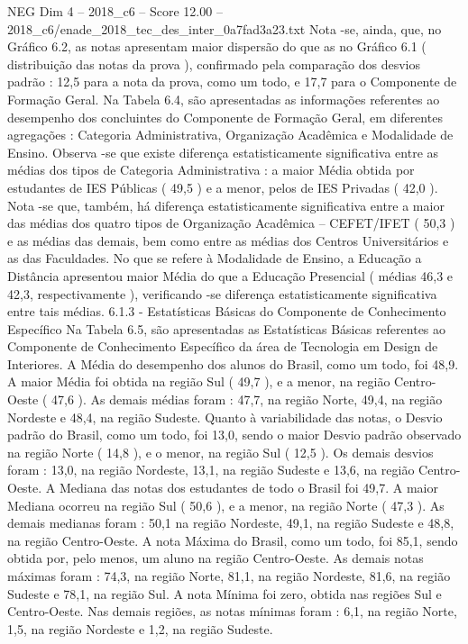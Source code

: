 \begin{textsample}{NEG Dim 4 – 2018\_c6 – Score 12.00 – 2018\_c6/enade\_2018\_tec\_des\_inter\_0a7fad3a23.txt}
Nota -se, ainda, que, no Gráfico 6.2, as notas apresentam maior dispersão do que as no Gráfico 6.1 ( distribuição das notas da prova ), confirmado pela comparação dos desvios padrão : 12,5 para a nota da prova, como um todo, e 17,7 para o Componente de Formação Geral.
Na Tabela 6.4, são apresentadas as informações referentes ao desempenho dos concluintes do Componente de Formação Geral, em diferentes agregações : Categoria Administrativa, Organização Acadêmica e Modalidade de Ensino.
Observa -se que existe diferença estatisticamente significativa entre as médias dos tipos de Categoria Administrativa : a maior Média obtida por estudantes de IES Públicas ( 49,5 ) e a menor, pelos de IES Privadas ( 42,0 ).
Nota -se que, também, há diferença estatisticamente significativa entre a maior das médias dos quatro tipos de Organização Acadêmica – CEFET/IFET ( 50,3 ) e as médias das demais, bem como entre as médias dos Centros Universitários e as das Faculdades.
No que se refere à Modalidade de Ensino, a Educação a Distância apresentou maior Média do que a Educação Presencial ( médias 46,3 e 42,3, respectivamente ), verificando -se diferença estatisticamente significativa entre tais médias. 6.1.3 - Estatísticas Básicas do Componente de Conhecimento Específico Na Tabela 6.5, são apresentadas as Estatísticas Básicas referentes ao Componente de Conhecimento Específico da área de Tecnologia em Design de Interiores.
A Média do desempenho dos alunos do Brasil, como um todo, foi 48,9.
A maior Média foi obtida na região Sul ( 49,7 ), e a menor, na região Centro-Oeste ( 47,6 ).
As demais médias foram : 47,7, na região Norte, 49,4, na região Nordeste e 48,4, na região Sudeste.
Quanto à variabilidade das notas, o Desvio padrão do Brasil, como um todo, foi 13,0, sendo o maior Desvio padrão observado na região Norte ( 14,8 ), e o menor, na região Sul ( 12,5 ).
Os demais desvios foram : 13,0, na região Nordeste, 13,1, na região Sudeste e 13,6, na região Centro-Oeste.
A Mediana das notas dos estudantes de todo o Brasil foi 49,7.
A maior Mediana ocorreu na região Sul ( 50,6 ), e a menor, na região Norte ( 47,3 ).
As demais medianas foram : 50,1 na região Nordeste, 49,1, na região Sudeste e 48,8, na região Centro-Oeste.
A nota Máxima do Brasil, como um todo, foi 85,1, sendo obtida por, pelo menos, um aluno na região Centro-Oeste.
As demais notas máximas foram : 74,3, na região Norte, 81,1, na região Nordeste, 81,6, na região Sudeste e 78,1, na região Sul.
A nota Mínima foi zero, obtida nas regiões Sul e Centro-Oeste.
Nas demais regiões, as notas mínimas foram : 6,1, na região Norte, 1,5, na região Nordeste e 1,2, na região Sudeste.

\end{textsample}
